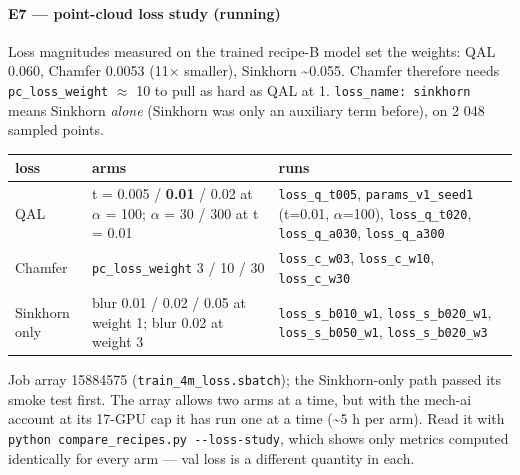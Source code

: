 \documentclass[
  10pt,
]{article}
\newcounter{none} %
\begin{document}
\paragraph{E7 --- point-cloud loss study
(running)}\label{e7-point-cloud-loss-study-running}

Loss magnitudes measured on the trained recipe-B model set the weights:
QAL 0.060, Chamfer 0.0053 (11× smaller), Sinkhorn \textasciitilde0.055.
Chamfer therefore needs \texttt{pc\_loss\_weight} \(\approx\) 10 to pull
as hard as QAL at 1. \texttt{loss\_name:\ sinkhorn} means Sinkhorn
\emph{alone} (Sinkhorn was only an auxiliary term before), on 2 048
sampled points.

{\def\LTcaptype{none} %
\begin{longtable}[]{@{}
  >{\raggedright\arraybackslash}p{}
  >{\raggedright\arraybackslash}p{}
  >{\raggedright\arraybackslash}p{}@{}}
\toprule\noalign{}
\begin{minipage}[b]{\linewidth}\raggedright
loss
\end{minipage} & \begin{minipage}[b]{\linewidth}\raggedright
arms
\end{minipage} & \begin{minipage}[b]{\linewidth}\raggedright
runs
\end{minipage} \\
\midrule\noalign{}
\endhead
\bottomrule\noalign{}
\endlastfoot
QAL & t = 0.005 / \textbf{0.01} / 0.02 at \(\alpha\) = 100; \(\alpha\) =
30 / 300 at t = 0.01 & \texttt{loss\_q\_t005},
\texttt{params\_v1\_seed1} (t=0.01, \(\alpha\)=100),
\texttt{loss\_q\_t020}, \texttt{loss\_q\_a030},
\texttt{loss\_q\_a300} \\
Chamfer & \texttt{pc\_loss\_weight} 3 / 10 / 30 & \texttt{loss\_c\_w03},
\texttt{loss\_c\_w10}, \texttt{loss\_c\_w30} \\
Sinkhorn only & blur 0.01 / 0.02 / 0.05 at weight 1; blur 0.02 at weight
3 & \texttt{loss\_s\_b010\_w1}, \texttt{loss\_s\_b020\_w1},
\texttt{loss\_s\_b050\_w1}, \texttt{loss\_s\_b020\_w3} \\
\end{longtable}
}

Job array 15884575 (\texttt{train\_4m\_loss.sbatch}); the Sinkhorn-only
path passed its smoke test first. The array allows two arms at a time,
but with the mech-ai account at its 17-GPU cap it has run one at a time
(\textasciitilde5 h per arm). Read it with
\texttt{python\ compare\_recipes.py\ -\/-loss-study}, which shows only
metrics computed identically for every arm --- val loss is a different
quantity in each.
\end{document}
